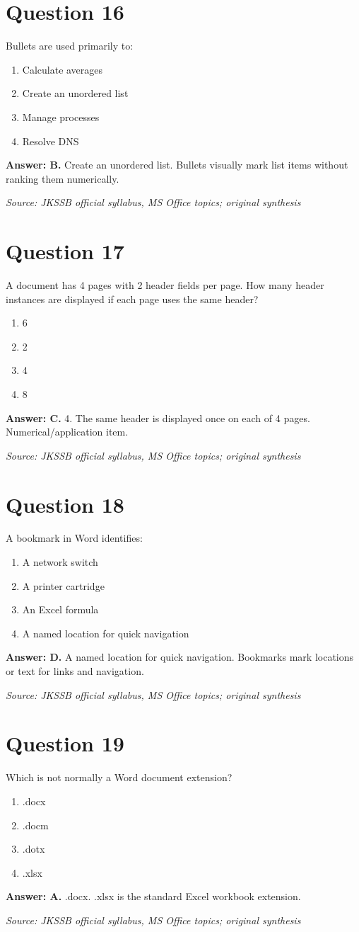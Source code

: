 \documentclass[11pt,a4paper]{book}
\newcommand{\source}[1]{\par\smallskip\textit{Source: #1}}
\newcommand{\answer}[2]{\par\textbf{Answer: #1.} #2}
\begin{document}
\section*{Question 16}
Bullets are used primarily to:
\begin{enumerate}[label=\Alph*.]
\item Calculate averages
\item Create an unordered list
\item Manage processes
\item Resolve DNS
\end{enumerate}
\answer{B}{Create an unordered list. Bullets visually mark list items without ranking them numerically.}
\source{JKSSB official syllabus, MS Office topics; original synthesis}
\section*{Question 17}
A document has 4 pages with 2 header fields per page. How many header instances are displayed if each page uses the same header?
\begin{enumerate}[label=\Alph*.]
\item 6
\item 2
\item 4
\item 8
\end{enumerate}
\answer{C}{4. The same header is displayed once on each of 4 pages. Numerical/application item.}
\source{JKSSB official syllabus, MS Office topics; original synthesis}
\section*{Question 18}
A bookmark in Word identifies:
\begin{enumerate}[label=\Alph*.]
\item A network switch
\item A printer cartridge
\item An Excel formula
\item A named location for quick navigation
\end{enumerate}
\answer{D}{A named location for quick navigation. Bookmarks mark locations or text for links and navigation.}
\source{JKSSB official syllabus, MS Office topics; original synthesis}
\section*{Question 19}
Which is not normally a Word document extension?
\begin{enumerate}[label=\Alph*.]
\item .docx
\item .docm
\item .dotx
\item .xlsx
\end{enumerate}
\answer{A}{.docx. .xlsx is the standard Excel workbook extension.}
\source{JKSSB official syllabus, MS Office topics; original synthesis}
\end{document}
